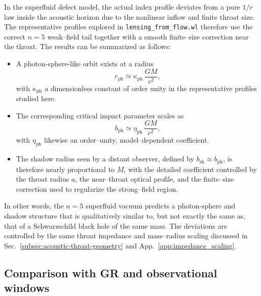 \documentclass[11pt]{article}
\begin{document}
In the superfluid defect model, the actual index profile deviates from a
pure \(1/r\) law inside the acoustic horizon due to the nonlinear inflow and
finite throat size.  The representative profiles explored in
\texttt{lensing\_from\_flow.wl} therefore use the correct \(n=5\) weak--field
tail together with a smooth finite--size correction near the throat.  The
results can be summarized as
follows:
\begin{itemize}
  \item A photon-sphere-like orbit exists at a radius
        \begin{equation}
          r_{\text{ph}}
          \simeq \kappa_{\text{ph}}\,\frac{G M}{c^2},
          \label{eq:rph-scaling}
        \end{equation}
        with \(\kappa_{\text{ph}}\) a dimensionless constant of order
        unity in the representative profiles studied here.
  \item The corresponding critical impact parameter scales as
        \begin{equation}
          b_{\text{ph}}
          \simeq \eta_{\text{ph}}\,\frac{G M}{c^2},
          \label{eq:bph-scaling}
        \end{equation}
        with \(\eta_{\text{ph}}\) likewise an order--unity, model--dependent
        coefficient.
  \item The shadow radius seen by a distant observer, defined by
        \(b_{\text{sh}} \approx b_{\text{ph}}\), is therefore nearly
        proportional to \(M\), with the detailed coefficient controlled by
        the throat radius \(a\), the near--throat optical profile, and the
        finite--size correction used to regularize the strong--field region.
\end{itemize}
In other words, the \(n=5\) superfluid vacuum predicts a photon-sphere and
shadow structure that is qualitatively similar to, but not exactly the same
as, that of a Schwarzschild black hole of the same mass.  The deviations are
controlled by the same throat impedance and mass--radius scaling discussed
in Sec.~\ref{subsec:acoustic-throat-geometry} and
App.~\ref{app:impedance_scaling}.

\subsection{Comparison with GR and observational windows}
\label{subsec:photon-GR-comparison}
\end{document}
